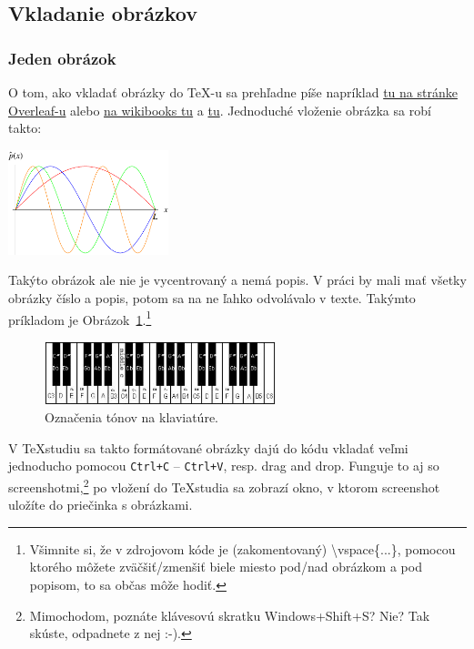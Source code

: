 \subsection{Vkladanie obrázkov}\label{sec:vkladanie_obrazkov}

\subsubsection{Jeden obrázok}
O tom, ako vkladať obrázky do TeX-u sa prehľadne píše napríklad \href{https://www.overleaf.com/learn/latex/Inserting_Images}{tu na stránke Overleaf-u} alebo \href{https://en.wikibooks.org/wiki/LaTeX/Importing_Graphics}{na wikibooks tu} a \href{https://en.wikibooks.org/wiki/LaTeX/Floats,_Figures_and_Captions}{tu}. Jednoduché vloženie obrázka sa robí takto:

\includegraphics[width=0.35\textwidth]{stoj2}

Takýto obrázok ale nie je vycentrovaný a nemá popis. V práci by mali mať všetky obrázky číslo a popis, potom sa na ne ľahko odvolávalo v texte. Takýmto príkladom je Obrázok~\ref{fig:klavir}.\footnote{Všimnite si, že v zdrojovom kóde je (zakomentovaný) \textbackslash vspace\{...\}, pomocou ktorého môžete zväčšiť/zmenšiť biele miesto pod/nad obrázkom a pod popisom, to sa občas môže hodiť.}

\begin{figure}[h]
	\centering
	\includegraphics[width=0.6\textwidth]{klavir2}
	\caption{Označenia tónov na klaviatúre.}
	\label{fig:klavir}
\end{figure}

V TeXstudiu sa takto formátované obrázky dajú do kódu vkladať veľmi jednoducho pomocou \verb|Ctrl+C| -- \verb|Ctrl+V|, resp. drag and drop. Funguje to aj so screenshotmi,\footnote{Mimochodom, poznáte klávesovú skratku Windows+Shift+S? Nie? Tak skúste, odpadnete z nej :-).} po vložení do TeXstudia sa zobrazí okno, v ktorom screenshot uložíte do priečinka s obrázkami.

